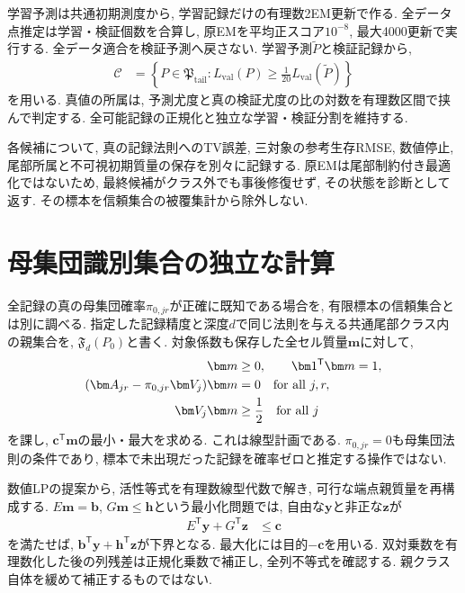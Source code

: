 学習予測は共通初期測度から, 学習記録だけの有理数2EM更新で作る.
全データ点推定は学習・検証個数を合算し,
原EMを平均正スコア$10^{-8}$, 最大4000更新で実行する.
全データ適合を検証予測へ戻さない.
学習予測$\widetilde P$と検証記録から,
\begin{align}
\mathcal C
&=\left\{P\in\mathfrak P_{\mathrm{tail}}:
L_{\mathrm{val}}(P)\ge
\frac1{20}L_{\mathrm{val}}(\widetilde P)\right\}
\label{eq:stage23_confidence_set}
\end{align}
を用いる.
真値の所属は, 予測尤度と真の検証尤度の比の対数を有理数区間で挟んで判定する.
全可能記録の正規化と独立な学習・検証分割を維持する.

各候補について, 真の記録法則へのTV誤差,
三対象の参考生存RMSE, 数値停止, 尾部所属と不可視初期質量の保存を別々に記録する.
原EMは尾部制約付き最適化ではないため,
最終候補がクラス外でも事後修復せず, その状態を診断として返す.
その標本を信頼集合の被覆集計から除外しない.

\section{母集団識別集合の独立な計算}
\label{sec:stage23_population_problem}

全記録の真の母集団確率$\pi_{0,jr}$が正確に既知である場合を,
有限標本の信頼集合とは別に調べる.
指定した記録精度と深度$d$で同じ法則を与える共通尾部クラス内の親集合を,
$\mathfrak F_d(P_0)$と書く.
対象係数も保存した全セル質量$\bm m$に対して,
\begin{align}
\bm m&\ge0,\qquad \bm1^{\mathsf T}\bm m=1,\notag\\
(\bm A_{jr}-\pi_{0,jr}\bm V_j)\bm m&=0
\quad\text{for all }j,r,\notag\\
\bm V_j\bm m&\ge\frac12
\quad\text{for all }j
\label{eq:stage23_population_constraints}
\end{align}
を課し, $\bm c^{\mathsf T}\bm m$の最小・最大を求める.
これは線型計画である.
$\pi_{0,jr}=0$も母集団法則の条件であり,
標本で未出現だった記録を確率ゼロと推定する操作ではない.

数値LPの提案から, 活性等式を有理数線型代数で解き,
可行な端点親質量を再構成する.
$E\bm m=\bm b$, $G\bm m\le\bm h$という最小化問題では,
自由な$\bm y$と非正な$\bm z$が
\begin{align}
E^{\mathsf T}\bm y+G^{\mathsf T}\bm z&\le\bm c
\label{eq:stage23_dual_feasibility}
\end{align}
を満たせば, $\bm b^{\mathsf T}\bm y+\bm h^{\mathsf T}\bm z$が下界となる.
最大化には目的$-\bm c$を用いる.
双対乗数を有理数化した後の列残差は正規化乗数で補正し,
全列不等式を確認する. 親クラス自体を緩めて補正するものではない.

